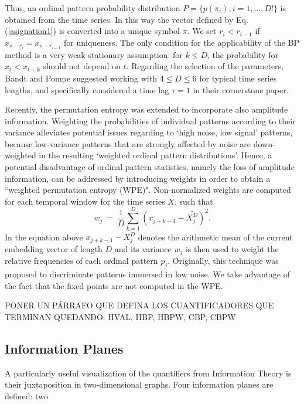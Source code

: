 Thus, an ordinal pattern probability distribution $P = \{ p(\pi_i), i = 1, \dots, D! \}$ is obtained from the time series.
In this way the vector defined by Eq. (\ref{asignation1}) is converted into a unique symbol $\pi$.
We set $r_i < r_{i-1}$ if $x_{s-r_{i}} = x_{s-r_{i-1}}$ for uniqueness.
The only condition for the applicability of the BP method is a very weak stationary assumption: for $k \leq D$, the probability for $x_t < x_{t+k}$ should not depend on $t$.
Regarding the selection of the parameters, Bandt and Pompe suggested working with $4 \leq D \leq 6$ for typical time series lengths, and specifically considered a time lag $\tau = 1$ in their cornerstone paper.

Recently, the permutation entropy was extended to incorporate also amplitude information.
Weighting the probabilities of individual patterns according to their variance alleviates potential issues regarding to ‘high noise, low signal’ patterns, because low-variance patterns that are strongly affected by noise are down-weighted in the resulting ‘weighted ordinal pattern distributions’.
Hence, a potential disadvantage of ordinal pattern statistics, namely the loss of amplitude information, can be addressed by introducing weights in order to obtain a ``weighted permutation entropy (WPE)".
Non-normalized weights are computed for each temporal window for the time series $X$, such that
\begin{equation}
\label{WPE_weigth}
w_j~=~\frac{1}{D}\sum_{k=1}^{D} \left(x_{j+k-1}-\bar{X_j^D}\right)^2.
\end{equation}
In the equation above $x_{j+k-1}-\bar{X_j^D}$ denotes the arithmetic mean of the current embedding vector of length $D$ and its variance $w_j$ is then used to weight the relative frequencies of each ordinal pattern $p_j$.
Originally, this technique was proposed to discriminate patterns immersed in low noise.
We take advantage of the fact that the fixed points are not computed in the WPE.

PONER UN PÁRRAFO QUE DEFINA LOS CUANTIFICADORES QUE TERMINAN QUEDANDO: HVAL, HBP, HBPW, CBP, CBPW

\subsection{Information Planes}

A particularly useful visualization of the quantifiers from Information Theory is their juxtaposition in two-dimensional graphs.
Four information planes are defined: two


